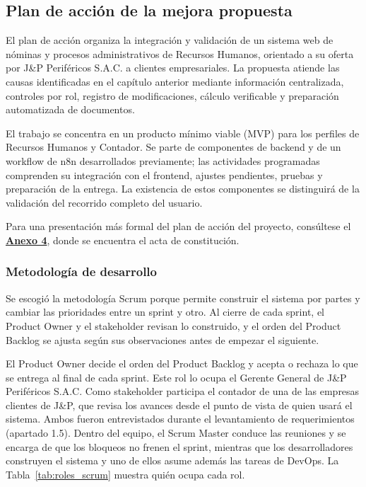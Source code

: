 \subsection{Plan de acción de la mejora propuesta}

El plan de acción organiza la integración y validación de un sistema web de nóminas y procesos administrativos de Recursos Humanos, 
orientado a su oferta por J\&P Periféricos S.A.C. a clientes empresariales. 
La propuesta atiende las causas identificadas en el capítulo anterior mediante información centralizada, 
controles por rol, registro de modificaciones, cálculo verificable y preparación automatizada de documentos.

El trabajo se concentra en un producto mínimo viable (MVP) para los perfiles de Recursos Humanos y Contador. 
Se parte de componentes de backend y de un workflow de n8n desarrollados previamente; 
las actividades programadas comprenden su integración con el frontend, ajustes pendientes, 
pruebas y preparación de la entrega. La existencia de estos componentes se distinguirá de la validación del recorrido completo del usuario.

Para una presentación más formal del plan de acción del proyecto, consúltese el \textbf{\hyperref[tab:anexo_acta_constitucion_general]{Anexo 4}}, 
donde se encuentra el acta de constitución.

\subsubsection{Metodología de desarrollo}
Se escogió la metodología Scrum porque permite construir el sistema por partes y cambiar las prioridades entre un sprint y otro. 
Al cierre de cada sprint, el Product Owner y el stakeholder revisan lo construido, 
y el orden del Product Backlog se ajusta según sus observaciones antes de empezar el siguiente.


El Product Owner decide el orden del Product Backlog y acepta o rechaza lo que se entrega al final de cada sprint. 
Este rol lo ocupa el Gerente General de J\&P Periféricos S.A.C. 
Como stakeholder participa el contador de una de las empresas clientes de J\&P,
que revisa los avances desde el punto de vista de quien usará el sistema. 
Ambos fueron entrevistados durante el levantamiento de requerimientos (apartado 1.5).
Dentro del equipo, el Scrum Master conduce las reuniones y se encarga de que los bloqueos no frenen el sprint, 
mientras que los desarrolladores construyen el sistema y uno de ellos asume además las tareas de DevOps. 
La Tabla~\ref{tab:roles_scrum} muestra quién ocupa cada rol.

